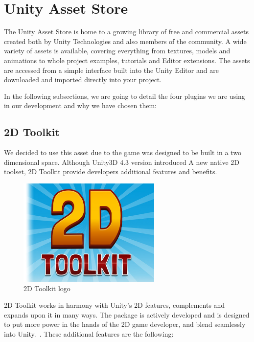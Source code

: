 \section{Unity Asset Store}
\label{sec:assetstore}

The Unity Asset Store is home to a growing library of free and commercial assets created both by Unity Technologies and also members of the community. A wide variety of assets is available, covering everything from textures, models and animations to whole project examples, tutorials and Editor extensions. The assets are accessed from a simple interface built into the Unity Editor and are downloaded and imported directly into your project.~\cite{unitypress8}

In the following subsections, we are going to detail the four plugins we are using in our development and why we have chosen them:

\subsection{2D Toolkit}
\label{subsec:2dtoolkit}
We decided to use this asset due to the game was designed to be built in a two dimensional space. Although Unity3D 4.3 version introduced A new native 2D toolset, 2D Toolkit provide developers additional features and benefits.

\begin{figure}[h]
\centering
\includegraphics[width=200pt]{graphics/enabling-tech/2dtoolkit_logo.jpg}
\caption{2D Toolkit logo}
\label{fig:2dtoolkit_logo}
\end{figure}

2D Toolkit works in harmony with Unity's 2D features, complements and expands upon it in many ways. The package is actively developed and is designed to put more power in the hands of the 2D game developer, and blend seamlessly into Unity.~\cite{2dtoolkit1}. These additional features are the following:

